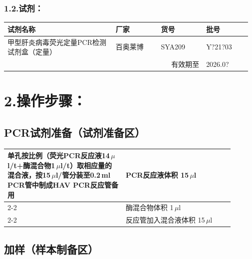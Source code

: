 \documentclass[UTF8,10pt,a4paper,fontset=fandol]{ctexart}
\newcommand{\fieldvalue}[1]{#1}
\newcommand{\handwritten}[1]{#1}
\begin{document}
\subsubsection*{1.2.\quad 试剂：}

\begin{tabular}{|p{0.43\linewidth}|p{0.18\linewidth}|p{0.18\linewidth}|p{0.18\linewidth}|}
\hline
试剂名称 & 厂家 & 货号 & 批号 \\
\hline
甲型肝炎病毒荧光定量PCR检测试剂盒（定量） &
百奥莱博 & SYA209 &
\fieldvalue{\handwritten{Y?21?03}} \\
\hline
\multicolumn{3}{|r|}{有效期至} &
\fieldvalue{\handwritten{2026.0?}} \\
\hline
\end{tabular}

\section*{2.\quad 操作步骤：}

\subsection*{PCR试剂准备（试剂准备区）}

\begin{tabular}{|p{0.47\linewidth}|p{0.43\linewidth}|}
\hline
单孔按比例（荧光PCR反应液14\,$\mu$l/t+酶混合物1\,$\mu$l/t）取相应量的混合液，按15\,$\mu$l/管分装至0.2\,ml PCR管中制成HAV PCR反应管备用 &
PCR反应液体积\quad
\fieldvalue{\handwritten{15}}\,$\mu$l \\
\cline{2-2}
& 酶混合物体积\quad
\fieldvalue{\handwritten{1}}\,$\mu$l \\
\cline{2-2}
& 反应管加入混合液体积\quad
\fieldvalue{\handwritten{15}}\,$\mu$l \\
\hline
\end{tabular}

\subsection*{加样（样本制备区）}
\end{document}
